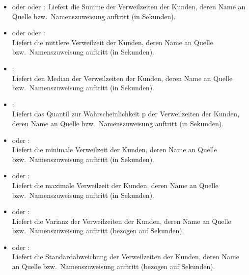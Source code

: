 \begin{itemize}

\item
{} oder  oder :\
Liefert die Summe der Verweilzeiten der Kunden, deren Name an Quelle bzw.\ Namenszuweisung  auftritt (in Sekunden).

\item
{} oder  oder :\\
Liefert die mittlere Verweilzeit der Kunden, deren Name an Quelle bzw.\ Namenszuweisung \cm{id} auftritt (in Sekunden).

\item
{}:\\
Liefert den Median der Verweilzeiten der Kunden, deren Name an Quelle bzw.\ Namenszuweisung  auftritt (in Sekunden).

\item
{}:\\
Liefert das Quantil zur Wahrscheinlichkeit p der Verweilzeiten der Kunden, deren Name an Quelle bzw.\ Namenszuweisung  auftritt (in Sekunden).

\item
{} oder :\\
Liefert die minimale Verweilzeit der Kunden, deren Name an Quelle bzw.\ Namenszuweisung  auftritt (in Sekunden).

\item
{} oder :\\
Liefert die maximale Verweilzeit der Kunden, deren Name an Quelle bzw.\ Namenszuweisung  auftritt (in Sekunden).

\item
{} oder :\\
Liefert die Varianz der Verweilzeiten der Kunden, deren Name an Quelle bzw.\ Namenszuweisung  auftritt (bezogen auf Sekunden).

\item
{} oder :\\
Liefert die Standardabweichung der Verweilzeiten der Kunden, deren Name an Quelle bzw.\ Namenszuweisung  auftritt (bezogen auf Sekunden).


\end{itemize}
